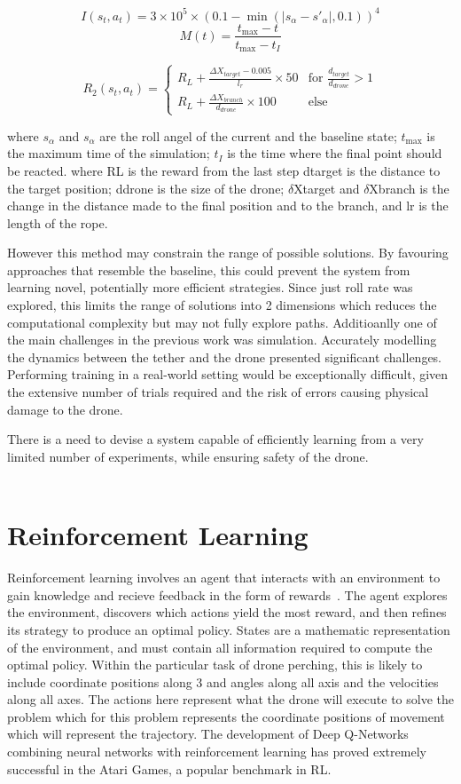\[I(s_{t}, a_{t}) = 3 \times 10 ^ 5 \times (0.1 - \min(|s_{\alpha} - s'_{\alpha}|, 0.1)) ^ 4\]
\[M(t) = \frac{t_{\max} - t}{t_{\max} - t_{I}}\]

\[
R_{2}(s_{t}, a_{t}) =
\begin{cases}
  R_{L} + \frac{\Delta X_{target} - 0.005}{l_{r}} \times 50 & \text{for } \frac{d_{target}}{d_{drone}} > 1 \\
  R_{L} + \frac{\Delta X_{branch}}{d_{drone}} \times 100 & \text{else}
\end{cases}
\]

where $s_{\alpha}$ and $s_{\alpha}$ are the roll angel of the current and the baseline state; 
$t_{\max}$ is the maximum time of the simulation; 
$t_{I}$ is the time where the final point should be reacted.
where RL is the reward from the last step dtarget is the distance to the target position; 
ddrone is the size of the drone; 
$\delta$Xtarget and $\delta$Xbranch is the change in the distance made to the final position and to the branch, and lr is the length of the rope.

However this method may constrain the range of possible solutions.
By favouring approaches that resemble the baseline, this could prevent the system from learning novel, potentially more efficient strategies.
Since just roll rate was explored, this limits the range of solutions into 2 dimensions which reduces the computational complexity but may not fully explore paths.
Additioanlly one of the main challenges in the previous work was simulation.
Accurately modelling the dynamics between the tether and the drone presented significant challenges.
Performing training in a real-world setting would be exceptionally difficult, given the extensive number of trials required and the risk of errors causing physical damage to the drone.

There is a need to devise a system capable of efficiently learning from a very limited number of experiments, while ensuring safety of the drone. \\\\

\section{Reinforcement Learning}
Reinforcement learning involves an agent that interacts with an environment to gain knowledge and recieve feedback in the form of rewards~\cite{rlIntroSuttonBarlo}.
The agent explores the environment, discovers which actions yield the most reward, and then refines its strategy to produce an optimal policy.
States are a mathematic representation of the environment, and must contain all information required to compute the optimal policy.
Within the particular task of drone perching, this is likely to include coordinate positions along 3 and angles along all axis and the velocities along all axes.
The actions here represent what the drone will execute to solve the problem which for this problem represents the coordinate positions of movement which will represent the trajectory.
The development of Deep Q-Networks combining neural networks with reinforcement learning has proved extremely successful in the Atari Games, a popular benchmark in RL.

